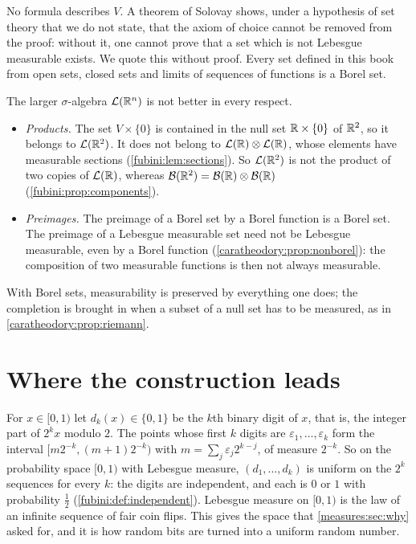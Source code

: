 \begin{notechapter}
\begin{remark}\label{caratheodory:rem:choice}
No formula describes $V$. A theorem of Solovay shows, under a
hypothesis of set theory that we do not state, that the axiom of
choice cannot be removed from the proof: without it, one cannot prove
that a set which is not Lebesgue measurable exists. We quote this
without proof. Every set defined in this book from open sets, closed
sets and limits of sequences of functions is a Borel set.
\end{remark}

\begin{pitfall}
The larger $\sigma$-algebra $\mathcal L(\mathbb{R}^n)$ is not better in every
respect.
\begin{itemize}[nosep]
  \item \emph{Products.} The set $V\times\{0\}$ is contained in the
        null set $\mathbb{R}\times\{0\}$ of $\mathbb{R}^2$, so it belongs to
        $\mathcal L(\mathbb{R}^2)$. It does not belong to
        $\mathcal L(\mathbb{R})\otimes\mathcal L(\mathbb{R})$, whose elements have
        measurable sections (\cref{fubini:lem:sections}). So
        $\mathcal L(\mathbb{R}^2)$ is not the product of two copies of
        $\mathcal L(\mathbb{R})$, whereas
        $\mathcal B(\mathbb{R}^2) = \mathcal B(\mathbb{R})\otimes\mathcal B(\mathbb{R})$
        (\cref{fubini:prop:components}).
  \item \emph{Preimages.} The preimage of a Borel set by a Borel
        function is a Borel set. The preimage of a Lebesgue measurable
        set need not be Lebesgue measurable, even by a Borel function
        (\cref{caratheodory:prop:nonborel}): the composition of two
        measurable functions is then not always measurable.
\end{itemize}
With Borel sets, measurability is preserved by everything one does;
the completion is brought in when a subset of a null set has to be
measured, as in \cref{caratheodory:prop:riemann}.
\end{pitfall}

\section{Where the construction leads}\label{caratheodory:sec:outlook}

\begin{example}\label{caratheodory:ex:coins}
For $x\in[0, 1)$ let $d_k(x)\in\{0, 1\}$ be the $k$th binary digit of
$x$, that is, the integer part of $2^kx$ modulo $2$. The points whose
first $k$ digits are $\varepsilon_1, \dots, \varepsilon_k$ form the
interval $[m2^{-k}, (m + 1)2^{-k})$ with
$m = \sum_j\varepsilon_j2^{k-j}$, of measure $2^{-k}$. So on the
probability space $[0, 1)$ with Lebesgue measure, $(d_1, \dots, d_k)$
is uniform on the $2^k$ sequences for every $k$: the digits are
independent, and each is $0$ or $1$ with probability $\frac12$
(\cref{fubini:def:independent}). Lebesgue measure on $[0, 1)$ is the
law of an infinite sequence of fair coin flips. This gives the space
that \cref{measures:sec:why} asked for, and it is how random bits are
turned into a uniform random number.
\end{example}


\end{notechapter}
